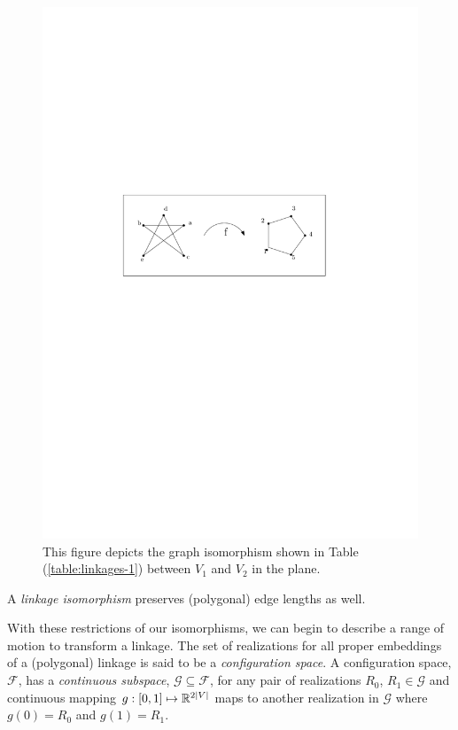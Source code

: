 \begin{figure}[!h]
\begin{center}
\includegraphics[scale=1]{graphics/graphIsomorphismExample.pdf}
\end{center} 
\caption{This figure depicts the graph isomorphism shown in Table 
(\ref{table:linkages-1}) between 
$V_1$ and $V_2$ in the plane.}
\label{fig:configuration-3}
\end{figure}
A \textit{linkage isomorphism} preserves (polygonal) edge lengths as well.
 
With these restrictions of our isomorphisms, we can begin to describe a range of motion to 
transform a linkage.  The set of realizations for all proper embeddings of a (polygonal) linkage is 
said to be a \textit{configuration space}.  A configuration space, $\mathcal{F}$, has a 
\textit{continuous subspace}, $\mathcal{G}\subseteq \mathcal{F}$, for any pair of realizations 
$R_0$, $R_1 \in 
\mathcal{G}$ and continuous mapping $g: [0,1] \mapsto {\mathbb{R}}^{2 \vert V \vert}$ maps to another 
realization in $\mathcal{G}$ where $g(0) = R_0$ and $g(1) = R_1$. 

